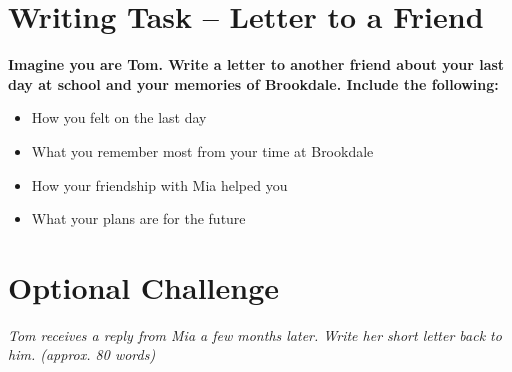 \vspace{1.5em}

\section*{Writing Task – Letter to a Friend}
\textbf{Imagine you are Tom. Write a letter to another friend about your last day at school and your memories of Brookdale. Include the following:}

\begin{itemize}
  \item How you felt on the last day
  \item What you remember most from your time at Brookdale
  \item How your friendship with Mia helped you
  \item What your plans are for the future
\end{itemize}

\vspace{1em}

\noindent{}

\vspace{2em}

\section*{Optional Challenge}
\textit{Tom receives a reply from Mia a few months later. Write her short letter back to him. (approx. 80 words)}

